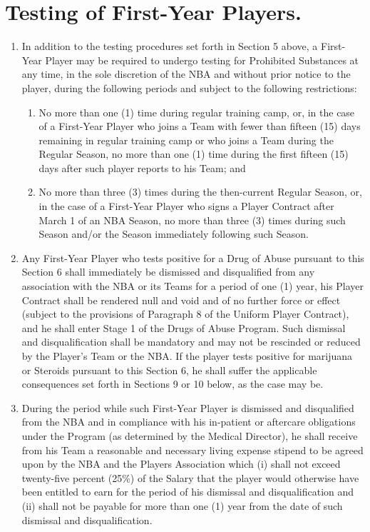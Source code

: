 \documentclass[
]{book}
\providecommand{\tightlist}{%
  \setlength{\itemsep}{0pt}\setlength{\parskip}{0pt}}
\begin{document}
\hypertarget{testing-of-first-year-players.}{%
\section{Testing of First-Year Players.}\label{testing-of-first-year-players.}}

\begin{enumerate}
\def\labelenumi{(\alph{enumi})}
\item
  In addition to the testing procedures set forth in Section 5 above, a First-Year Player may be required to undergo testing for Prohibited Substances at any time, in the sole discretion of the NBA and without prior notice to the player, during the following periods and subject to the following restrictions:

  \begin{enumerate}
  \def\labelenumii{(\roman{enumii})}
  \tightlist
  \item
    No more than one (1) time during regular training camp, or, in the case of a First-Year Player who joins a Team with fewer than fifteen (15) days remaining in regular training camp or who joins a Team during the Regular Season, no more than one (1) time during the first fifteen (15) days after such player reports to his Team; and
  \item
    No more than three (3) times during the then-current Regular Season, or, in the case of a First-Year Player who signs a Player Contract after March 1 of an NBA Season, no more than three (3) times during such Season and/or the Season immediately following such Season.
  \end{enumerate}
\item
  Any First-Year Player who tests positive for a Drug of Abuse pursuant to this Section 6 shall immediately be dismissed and disqualified from any association with the NBA or its Teams for a period of one (1) year, his Player Contract shall be rendered null and void and of no further force or effect (subject to the provisions of Paragraph 8 of the Uniform Player Contract), and he shall enter Stage 1 of the Drugs of Abuse Program. Such dismissal and disqualification shall be mandatory and may not be rescinded or reduced by the Player's Team or the NBA. If the player tests positive for marijuana or Steroids pursuant to this Section 6, he shall suffer the applicable consequences set forth in Sections 9 or 10 below, as the case may be.
\item
  During the period while such First-Year Player is dismissed and disqualified from the NBA and in compliance with his in-patient or aftercare obligations under the Program (as determined by the Medical Director), he shall receive from his Team a reasonable and necessary living expense stipend to be agreed upon by the NBA and the Players Association which (i) shall not exceed twenty-five percent (25\%) of the Salary that the player would otherwise have been entitled to earn for the period of his dismissal and disqualification and (ii) shall not be payable for more than one (1) year from the date of such dismissal and disqualification.

\end{enumerate}
\end{document}
